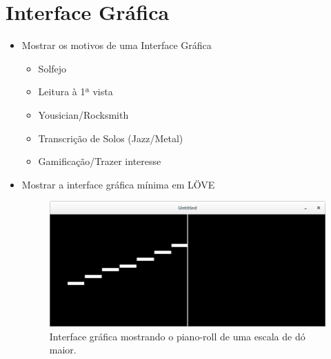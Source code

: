 \section{Interface Gráfica}
\label{sec:gui}

\begin{itemize}
\item Mostrar os motivos de uma Interface Gráfica
	\begin{itemize}
	\item Solfejo
	\item Leitura à 1ª vista 
	\item Yousician/Rocksmith
	\item Transcrição de Solos (Jazz/Metal)
	\item Gamificação/Trazer interesse
	\end{itemize}
\item Mostrar a interface gráfica mínima em LÖVE
\begin{figure}[h]
\centering
\includegraphics[width=0.6\linewidth]{figuras/screen2.png}
\caption{\label{fig:screen2}Interface gráfica mostrando o piano-roll de uma escala de dó maior.}
\end{figure}

\end{itemize}
